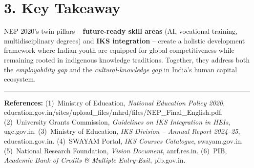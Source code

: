 \documentclass[11pt,a4paper]{article}
\begin{document}
\vspace{0.15cm}
\section{3. Key Takeaway}

NEP 2020's twin pillars -- \textbf{future-ready skill areas} (AI, vocational training, multidisciplinary degrees) and \textbf{IKS integration} -- create a holistic development framework where Indian youth are equipped for global competitiveness while remaining rooted in indigenous knowledge traditions. Together, they address both the \textit{employability gap} and the \textit{cultural-knowledge gap} in India's human capital ecosystem.

\vspace{0.25cm}
\noindent\rule{\textwidth}{0.5pt}
{\scriptsize\textbf{References:}
(1)~Ministry of Education, \textit{National Education Policy 2020}, education.gov.in/sites/upload\_files/mhrd/files/NEP\_Final\_English.pdf.
(2)~University Grants Commission, \textit{Guidelines on IKS Integration in HEIs}, ugc.gov.in.
(3)~Ministry of Education, \textit{IKS Division -- Annual Report 2024--25}, education.gov.in.
(4)~SWAYAM Portal, \textit{IKS Courses Catalogue}, swayam.gov.in.
(5)~National Research Foundation, \textit{Vision Document}, anrf.res.in.
(6)~PIB, \textit{Academic Bank of Credits \& Multiple Entry-Exit}, pib.gov.in.
}
\end{document}
